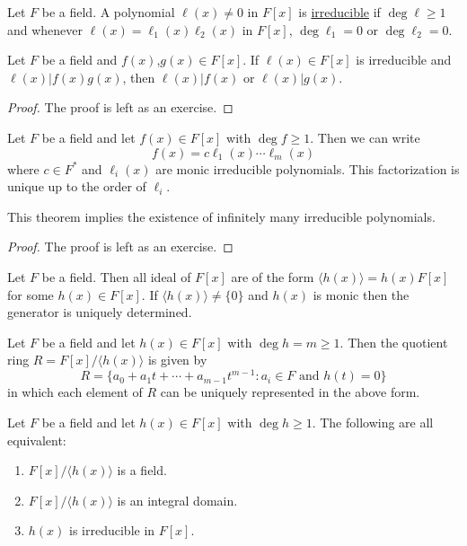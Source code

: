 \documentclass[11pt]{article}
\begin{document}
\begin{definition}
    Let $F$ be a field. A polynomial $\ell(x)\neq0$ in $F[x]$ is \ul{irreducible} if $\deg\ell\geq 1$ and whenever $\ell(x)=\ell_1(x)\ell_2(x)$ in $F[x]$, $\deg\ell_1=0$ or $\deg\ell_2=0$.
\end{definition}

\begin{proposition}
    Let $F$ be a field and $f(x)$,$g(x)\in F[x]$. If $\ell(x)\in F[x]$ is irreducible and $\ell(x)|f(x)g(x)$, then $\ell(x)|f(x)$ or $\ell(x)|g(x)$.
\end{proposition}

\begin{proof}
    The proof is left as an exercise.
\end{proof}

\begin{theorem}
    Let $F$ be a field and let $f(x)\in F[x]$ with $\deg f\geq 1$. Then we can write
    \[f(x)=c\ell_1(x)\cdots\ell_m(x)\]
    where $c\in F^*$ and $\ell_i(x)$ are monic irreducible polynomials. This factorization is unique up to the order of $\ell_i$.
\end{theorem}

\begin{remark}
    This theorem implies the existence of infinitely many irreducible polynomials.
\end{remark}

\begin{proof}
    The proof is left as an exercise.
\end{proof}

\begin{proposition}
    Let $F$ be a field. Then all ideal of $F[x]$ are of the form $\langle h(x)\rangle=h(x)F[x]$ for some $h(x)\in F[x]$. If $\langle h(x)\rangle\neq\{0\}$ and $h(x)$ is monic then the generator is uniquely determined.
\end{proposition}

\begin{proposition}
    Let $F$ be a field and let $h(x)\in F[x]$ with $\deg h=m\geq 1$. Then the quotient ring $R=F[x]/\langle h(x)\rangle$ is given by
    \[R=\{a_0+a_1t+\cdots+a_{m-1}t^{m-1}:a_i\in F\text{ and }h(t)=0\}\]
    in which each element of $R$ can be uniquely represented in the above form.
\end{proposition}

\begin{proposition}
    Let $F$ be a field and let $h(x)\in F[x]$ with $\deg h\geq 1$. The following are all equivalent:
    \begin{enumerate}
        \item $F[x]/\langle h(x)\rangle$ is a field.
        \item $F[x]/\langle h(x)\rangle$ is an integral domain.
        \item $h(x)$ is irreducible in $F[x]$.
    \end{enumerate}
\end{proposition}
\end{document}
